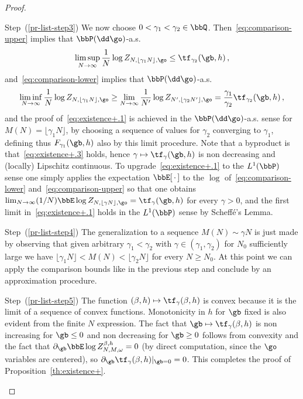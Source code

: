 \begin{proof}
\begin{step}{Step~(\ref{pr-list-step3})}
We now choose $0<\gamma_1<\gamma_2 \in \bbQ$. Then~\eqref{eq:comparison-upper} implies that $\bbP(\dd \go)$-a.s.
\begin{equation}\label{eq:fclb1}
\limsup_{N \to \infty} \frac{1}{N} \log Z_{N, \lfloor \gamma_1 N \rfloor, \go} \le \tf_{\gamma_2} (\gb, h)\,,
\end{equation}
and~\eqref{eq:comparison-lower} implies that $\bbP(\dd \go)$-a.s.
\begin{equation}\label{eq:fclb2}
\liminf_{N \to \infty} \frac{1}{N} \log Z_{N, \lfloor \gamma_1 N \rfloor, \go} \ge
\lim_{N \to \infty} \frac{1}{N'}\log Z_{N', \lfloor \gamma_2 N' \rfloor, \go}= \frac{\gamma_1}{\gamma_2}
\tf_{\gamma_2}(\gb, h)
\,,
\end{equation}
and the proof of~\eqref{eq:existence+.1} is achieved in the $\bbP(\dd \go)$-a.s. sense for $M(N)= \lfloor\gamma_1 N \rfloor$, by choosing a sequence of values for $\gamma_2$ converging to $\gamma_1$, defining thus $F_{\gamma_1}(\gb, h)$ also by this limit procedure. Note that a byproduct is that~\eqref{eq:existence+.3} holds, hence $\gamma\mapsto \tf_\gamma(\gb, h)$ is non decreasing and (locally) Lipschitz continuous. To upgrade~\eqref{eq:existence+.1} to the $L^1(\bbP)$ sense one simply applies the expectation $\bbE[{\,\cdot\,}]$ to the $\log$ of~\eqref{eq:comparison-lower} and~\eqref{eq:comparison-upper} so that one obtains $\lim_{N \to \infty} (1/N) \bbE\log Z_{N, \lfloor \gamma N \rfloor, \go} = \tf_{\gamma}(\gb, h)$ for every $\gamma>0$, and the first limit in~\eqref{eq:existence+.1} holds in the $L^1(\bbP)$ sense by Scheffé's Lemma.
\end{step}



\begin{step}{Step~(\ref{pr-list-step4})}
The generalization to a sequence $M(N)\sim \gamma N$ is just made by observing that given arbitrary $\gamma_1< \gamma_2$ with $\gamma \in (\gamma_1, \gamma_2)$ for $N_0$ sufficiently large we have $\lfloor \gamma_1 N \rfloor < M(N) < \lfloor \gamma_2 N \rfloor$ for every $N \ge N_0$. At this point we can apply the comparison bounds like in the previous step and conclude by an approximation procedure.
\end{step}


\begin{laststep}{Step~(\ref{pr-list-step5})}
The function $(\beta,h) \mapsto \tf_\gamma(\beta,h)$ is convex because it is the limit of a sequence of convex functions. Monotonicity in $h$ for $\gb$ fixed is also evident from the finite $N$ expression. The fact that $\gb \mapsto \tf_\gamma(\beta,h)$ is non increasing for $\gb \le 0$ and non decreasing for $\gb \ge 0$ follows from convexity and the fact that $\partial _\gb \bbE \log Z_{N,M,\omega}^{\beta,h}=0$ (by direct computation, since the $\go$ variables are centered), so $\partial_\gb \tf_\gamma(\beta,h) \vert_{\gb=0}=0$. This completes the proof of Proposition~\ref{th:existence+}.
\end{laststep}
\let\qed\relax
\end{proof}
\goodbreak

